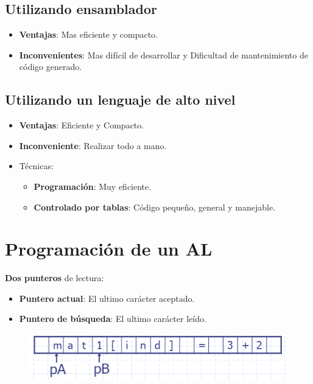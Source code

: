 \documentclass[12pt]{report} %
\begin{document}
\subsection{Utilizando ensamblador}

\begin{itemize}

\item
  \textbf{Ventajas}: Mas eficiente y compacto.
\item
  \textbf{Inconvenientes}: Mas difícil de desarrollar y Dificultad de
  mantenimiento de código generado.
\end{itemize}


\subsection{Utilizando un lenguaje de alto nivel}

\begin{itemize}
\item
  \textbf{Ventajas}: Eficiente y Compacto.
\item
  \textbf{Inconveniente}: Realizar todo a mano.
\item
  Técnicas:

  \begin{itemize}
  \item \textbf{Programación}: Muy eficiente.    
  \item \textbf{Controlado por tablas}: Código pequeño, general y
    manejable.
  \end{itemize}
\end{itemize}


\section{Programación de un AL}

\textbf{Dos punteros} de lectura:

\begin{itemize}
\item
  \textbf{Puntero actual}: El ultimo carácter aceptado.
\item
  \textbf{Puntero de búsqueda}: El ultimo carácter leído.
\end{itemize}

\begin{figure}[H]
	{\includegraphics[scale=.3]{Untitled 33.png}}
\end{figure}
\end{document}
